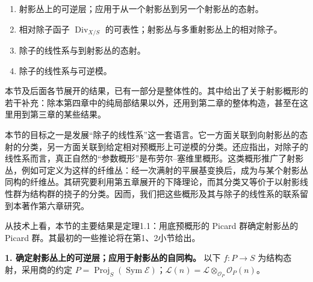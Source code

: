 \begingroup
\def\newscope{V-L}
\def\OO{\mathcal O}
\def\LL{\mathcal L}
\def\MM{\mathcal M}
\def\EE{\mathcal E}
\def\Pic{\operatorname{Pic}}
\def\Sym{\operatorname{Sym}}
\def\Proj{\operatorname{Proj}}
\def\Spec{\operatorname{Spec}}
\def\Hom{\operatorname{Hom}}
\begin{enumerate}
\item 射影丛上的可逆层；应用于从一个射影丛到另一个射影丛的态射。
\item 相对除子函子 \(\operatorname{Div}_{X/S}\) 的可表性；射影丛与多重射影丛上的相对除子。
\item 除子的线性系与到射影丛的态射。
\item 除子的线性系与可逆模。
\end{enumerate}

本节及后面各节展开的结果，已有一部分是整体性的。其中给出了关于射影概形的若干补充：除本第四章中的纯局部结果以外，还用到第二章的整体构造，甚至在这里用到第三章的某些结果。

本节的目标之一是发展“除子的线性系”这一套语言。它一方面关联到向射影丛的态射的分类，另一方面关联到给定相对预概形上可逆模的分类。还应指出，对除子的线性系而言，真正自然的“参数概形”是布劳尔--塞维里概形。这类概形推广了射影丛，例如可定义为这样的纤维丛：经一次满射的平展基变换后，成为与某个射影丛同构的纤维丛。其研究要利用第五章展开的下降理论，而其分类又等价于以射影线性群为结构群的挠子的分类。因而，我们把这些概形及其与除子的线性系的联系留到本著作第六章研究。

从技术上看，本节的主要结果是定理1.1：用底预概形的 Picard 群确定射影丛的 Picard 群。其最初的一些推论将在第1、2小节给出。

\noindent\textbf{1. 确定射影丛上的可逆层；应用于射影丛的自同构。}
以下 \(f:P\to S\) 为结构态射，采用商的约定 \(P=\Proj_S(\Sym \EE)\)；\(\LL(n)=\LL\otimes_{\OO_P}\OO_P(n)\)。

